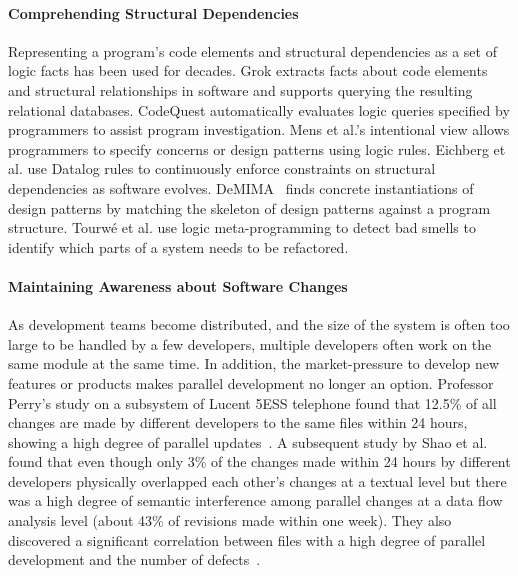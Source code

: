 \documentclass[runningheads,a4paper]{llncs}
\begin{document}
\paragraph{Comprehending Structural Dependencies} 
Representing a program's code elements and structural dependencies as a set of logic facts has been used for decades. Grok \cite{Holt1998} extracts facts about code elements and structural relationships in software and supports querying the resulting relational databases. CodeQuest \cite{Hajiyev2006} automatically evaluates logic queries specified by programmers to assist program investigation. Mens et al.'s intentional view \cite{Mens2002b} allows programmers to specify concerns or design patterns using logic rules. Eichberg et al. \cite{Eichberg2008} use Datalog rules to continuously enforce constraints on structural dependencies as software evolves. DeMIMA~\cite{Gueheneuc2008:demima} finds concrete instantiations of design patterns by matching the skeleton of design patterns against a program structure. Tourw{\'e} {et al.} \cite{Tourwe01} use logic meta-programming to detect bad smells to identify which parts of a system needs to be refactored.

\paragraph{Maintaining Awareness about Software Changes} 
As development teams become distributed, and the size of the system is often too large to be handled by a few developers, multiple developers often work on the same module at the same time. In addition, the market-pressure to develop new features or products makes parallel development no longer an option.
Professor Perry's study on a subsystem of Lucent 5ESS telephone found that 12.5\% of all changes are made by different developers to the same files within 24 hours, showing a high degree of parallel updates~\cite{Perry2001:parallel}. A subsequent study by Shao et al. found that even though only 3\% of the changes made within 24 hours by different developers physically overlapped each other's changes at a textual level but there was a high degree of semantic interference among parallel changes at a data flow analysis level (about 43\% of revisions made within one week). They also discovered a significant correlation between files with a high degree of parallel development and the number of defects~\cite{Shao2007:interference}. 

\end{document}
